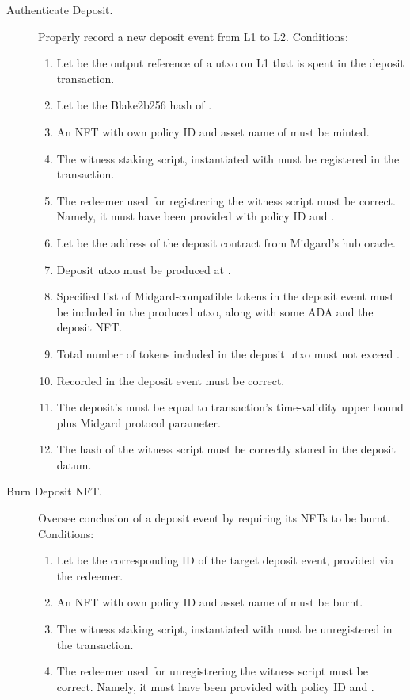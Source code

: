\documentclass[../midgard.tex]{subfiles}
\begin{document}
\begin{description}
  \item[Authenticate Deposit.] Properly record a new deposit event from L1 to L2.
    Conditions:
      \begin{enumerate}
        \item Let  be the output reference of a utxo on L1 that is spent in the deposit transaction.
        \item Let  be the Blake2b256 hash of .
        \item An NFT with own policy ID and asset name of  must be minted.
        \item The witness staking script, instantiated with  must be registered in the transaction.
        \item The redeemer used for registrering the witness script must be correct. Namely, it must have been provided with  policy ID and .
        \item Let  be the address of the deposit contract from Midgard's hub oracle.
        \item Deposit utxo must be produced at .
        \item Specified list of Midgard-compatible tokens in the deposit event must be included in the produced utxo, along with some ADA and the deposit NFT.
        \item Total number of tokens included in the deposit utxo must not exceed .
        \item Recorded  in the deposit event must be correct.
        \item The deposit's  must be equal to transaction's time-validity upper bound plus  Midgard protocol parameter.
        \item The hash of the witness script must be correctly stored in the deposit datum.
      \end{enumerate}
  \item[Burn Deposit NFT.] Oversee conclusion of a deposit event by requiring its NFTs to be burnt.
    Conditions:
      \begin{enumerate}
        \item Let  be the corresponding ID of the target deposit event, provided via the redeemer.
        \item An NFT with own policy ID and asset name of  must be burnt.
        \item The witness staking script, instantiated with  must be unregistered in the transaction.
        \item The redeemer used for unregistrering the witness script must be correct. Namely, it must have been provided with  policy ID and .
      \end{enumerate}
\end{description}
\end{document}
